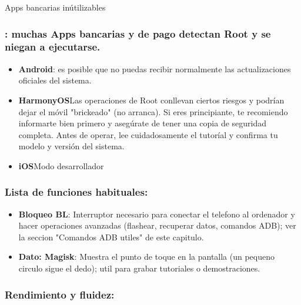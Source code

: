 


Apps bancarias inútilizables

\subsubsection*{: muchas Apps bancarias y de pago detectan Root y se niegan a ejecutarse.}

\begin{itemize}
  \item \textbf{Android}: es posible que no puedas recibir normalmente las actualizaciones oficiales del sistema.
  \item \textbf{HarmonyOS}Las operaciones de Root conllevan ciertos riesgos y podrían dejar el móvil "brickeado" (no arranca). Si eres principiante, te recomiendo informarte bien primero y asegúrate de tener una copia de seguridad completa. Antes de operar, lee cuidadosamente el tutoríal y confirma tu modelo y versión del sistema.
  \item \textbf{iOS}Modo desarrollador
\end{itemize}

\subsubsection*{Lista de funciones habituales:}

\begin{itemize}
  \item \textbf{Bloqueo BL}: Interruptor necesario para conectar el telefono al ordenador y hacer operaciones avanzadas (flashear, recuperar datos, comandos ADB); ver la seccion "Comandos ADB utiles" de este capitulo.
  \item \textbf{Dato: Magisk}: Muestra el punto de toque en la pantalla (un pequeno circulo sigue el dedo); util para grabar tutoriales o demostraciones.
\end{itemize}

\subsubsection*{Rendimiento y fluidez:}

